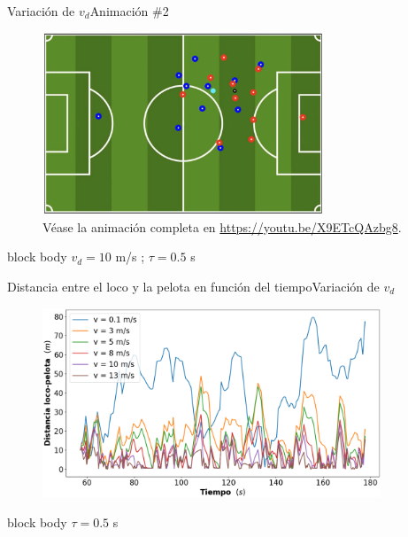 \documentclass{beamer}
\begin{document}
            \begin{frame}{Variación de $v_d$}{Animación \#2}
                \vspace*{-0.3cm}
                \begin{figure}[H!]
                    \includegraphics[width=0.75\textwidth]{./animacion_3}
                    \caption*{Véase la animación completa en \url{https://youtu.be/X9ETcQAzbg8}.}
                    \label{fig:futbol_3}
                \end{figure}
                \vspace*{-0.5cm}
                \begin{beamercolorbox}[sep=5pt,center]{block body}
                    \centering
                    \small{$v_d = 10$ m/s ; $\tau = 0.5$ s}
                \end{beamercolorbox}
            \end{frame}

            \begin{frame}{Distancia entre el loco y la pelota en función del tiempo}{Variación de $v_d$}
                    \begin{figure}[H!]
                        \includegraphics[width=0.9\textwidth]{./distancia_vs_tiempo_vd}
                        \label{fig:futbol_4}
                    \end{figure}
                    \begin{beamercolorbox}[sep=5pt,center]{block body}
                        \centering
                        \small{$\tau = 0.5$ s}
                    \end{beamercolorbox}
            \end{frame}
\end{document}
